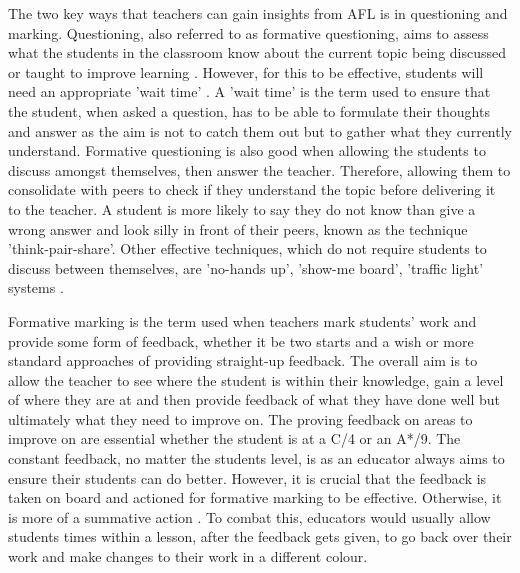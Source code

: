 	The two key ways that teachers can gain insights from AFL is in questioning and marking. Questioning, also referred to as formative questioning, aims to assess what the students in the classroom know about the current topic being discussed or taught to improve learning \cite{wellington2007secondary}. However, for this to be effective, students will need an appropriate 'wait time' \cite{black2001feedback}. A 'wait time' is the term used to ensure that the student, when asked a question, has to be able to formulate their thoughts and answer as the aim is not to catch them out but to gather what they currently understand. Formative questioning is also good when allowing the students to discuss amongst themselves, then answer the teacher. Therefore, allowing them to consolidate with peers to check if they understand the topic before delivering it to the teacher. A student is more likely to say they do not know than give a wrong answer and look silly in front of their peers, known as the technique 'think-pair-share'. Other effective techniques, which do not require students to discuss between themselves, are 'no-hands up', 'show-me board', 'traffic light' systems \cite{oecd}. 
	
	Formative marking is the term used when teachers mark students' work and provide some form of feedback, whether it be two starts and a wish or more standard approaches of providing straight-up feedback. The overall aim is to allow the teacher to see where the student is within their knowledge, gain a level of where they are at and then provide feedback of what they have done well but ultimately what they need to improve on. The proving feedback on areas to improve on are essential whether the student is at a C/4 or an A*/9. The constant feedback, no matter the students level, is as an educator always aims to ensure their students can do better. However, it is crucial that the feedback is taken on board and actioned for formative marking to be effective. Otherwise, it is more of a summative action \cite{black1998inside, william1990national}. To combat this, educators would usually allow students times within a lesson, after the feedback gets given, to go back over their work and make changes to their work in a different colour.
	
